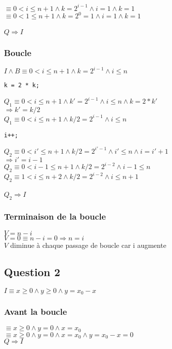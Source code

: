 \documentclass[11pt]{article}
\begin{document}
$\equiv 0 < i \leq n + 1 \land k = 2^{i - 1} \land i = 1 \land k = 1$\\
$\equiv 0 < 1 \leq n + 1 \land k = 2^0 = 1 \land i = 1 \land k = 1$\\\\
$Q \Rightarrow I$

\subsubsection{Boucle}
$I \land B \equiv 0 < i \leq n + 1 \land k = 2^{i-1} \land i \leq n$\\
\begin{lstlisting}[style=CStyle]
k = 2 * k;
\end{lstlisting}
$Q_{1}\equiv 0 < i \leq n + 1 \land k' = 2^{i-1} \land i \leq n \land k = 2 * k'$\\
$\Rightarrow k' = k / 2$\\
$Q_{1} \equiv 0 < i \leq n + 1 \land k/2 = 2^{i-1} \land i \leq n$\\
\begin{lstlisting}[style=CStyle]
i++;
\end{lstlisting}
$Q_{2} \equiv 0 < i' \leq n + 1 \land k / 2 = 2^{i'-1} \land i' \leq n \land i = i' + 1$\\
$\Rightarrow i' = i - 1$\\
$Q_{2} \equiv 0 < i - 1 \leq n + 1 \land k/2 = 2^{i - 2} \land i - 1 \leq n$\\
$Q_{2} \equiv 1 < i \leq n + 2 \land k/2 = 2^{i - 2} \land i \leq n + 1$\\\\
$Q_{2} \Rightarrow I$

\subsubsection{Terminaison de la boucle}
$V = n - i$\\
$V = 0 \equiv n - i = 0 \Rightarrow n = i$\\
$V$ diminue à chaque passage de boucle car i augmente

\subsection{Question 2}
$I \equiv x \geq 0 \land y \geq 0\land y = x_0 - x$

\subsubsection{Avant la boucle}
$\equiv x \geq 0 \land y = 0 \land x = x_0$\\
$\equiv x \geq 0 \land y = 0 \land x = x_0 \land y = x_0 - x = 0$\\
$Q \Rightarrow I$
\end{document}
